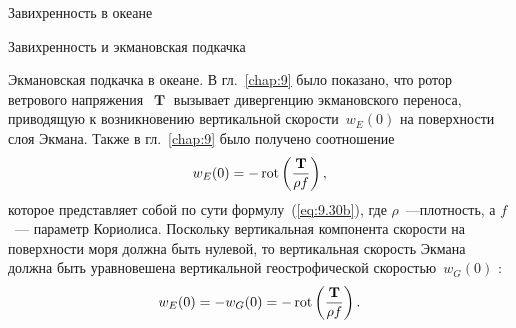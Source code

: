 \begin{chapter}{Завихренность в океане}
\begin{section}{Завихренность и экмановская подкачка}
\begin{paragraph}{Экмановская подкачка в океане.}
%
В гл.~\ref{chap:9} было показано, что ротор ветрового напряжения~$\mbfT$%
 вызывает
дивергенцию экмановского переноса, приводящую 
к возникновению вертикальной скорости~$w_E (0)$ на поверхности слоя Экмана. 
Также в гл.~\ref{chap:9} было получено соотношение
\begin{equation}
  w_E (0) = -\mathop{\mathrm{rot}}\nolimits\left(\frac{\mathbf{T}}{\rho f} \right),
\end{equation}
которое представляет собой по сути формулу~(\ref{eq:9.30b}), 
где $\rho$~---плотность, а $f$~--- параметр Кориолиса. 
Поскольку вертикальная компонента скорости на поверхности моря должна 
быть нулевой, то вертикальная скорость Экмана должна быть
уравновешена вертикальной геострофической скоростью~$w_G(0)$%
:
\begin{equation}\label{eq:12.21}
 w_E (0) = - w_G (0) = -\mathop{\mathrm{rot}}\nolimits\left(\frac{\mathbf{T}}{\rho f} \right).
\end{equation}
%


\end{paragraph}
\end{section}
\end{chapter}
